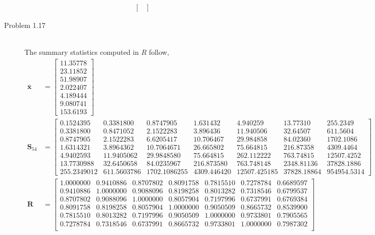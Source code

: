 \documentclass[letterpaper,10pt]{article}
\begin{document}
\begin{description}
\begin{align*}
\begin{bmatrix}
\end{bmatrix}
\end{align*}
\item[Problem 1.17]\hfill \\
The summary statistics computed in $R$ follow,
\begin{align*}
\bar{\textbf{x}} &= \begin{bmatrix}
11.35778\\23.11852\\51.98907\\2.022407\\4.189444\\9.080741\\153.6193
\end{bmatrix}\\
\textbf{S}_{54} &= \begin{bmatrix}
0.1524395 & 0.3381800  &  0.8747905  &  1.631432  &   4.940259  &  13.77310 &   255.2349\\
0.3381800 &  0.8471052  &  2.1522283  &  3.896436  &  11.940506  &  32.64507  &  611.5604\\
0.8747905 &  2.1522283  &  6.6205417 &  10.706467  &  29.984858  &  84.02360  & 1702.1086\\
1.6314321 &  3.8964362  & 10.7064671 &  26.665802  &  75.664815 &  216.87358  & 4309.4464\\
4.9402593 & 11.9405062   & 29.9848580 &  75.664815 &  262.112222 &  763.74815 & 12507.4252\\
13.7730988 & 32.6450658 &  84.0235967 & 216.873580  & 763.748148 & 2348.81136 & 37828.1886\\
255.2349012 & 611.5603786 & 1702.1086255 & 4309.446420 & 12507.425185 & 37828.18864 & 954954.5314
\end{bmatrix}\\
\textbf{R} &= \begin{bmatrix}
1.0000000 & 0.9410886 & 0.8707802 & 0.8091758 & 0.7815510 & 0.7278784 & 0.6689597\\
0.9410886 & 1.0000000 & 0.9088096 & 0.8198258 & 0.8013282 & 0.7318546 & 0.6799537\\
0.8707802 & 0.9088096 & 1.0000000 & 0.8057904 & 0.7197996 & 0.6737991 & 0.6769384\\
0.8091758 & 0.8198258 & 0.8057904 & 1.0000000 & 0.9050509 & 0.8665732 & 0.8539900\\
0.7815510 & 0.8013282 & 0.7197996 & 0.9050509 & 1.0000000 & 0.9733801 & 0.7905565\\
0.7278784 & 0.7318546 & 0.6737991 & 0.8665732 & 0.9733801 & 1.0000000 & 0.7987302\\

\end{bmatrix}
\end{align*}
\end{description}
\end{document}
